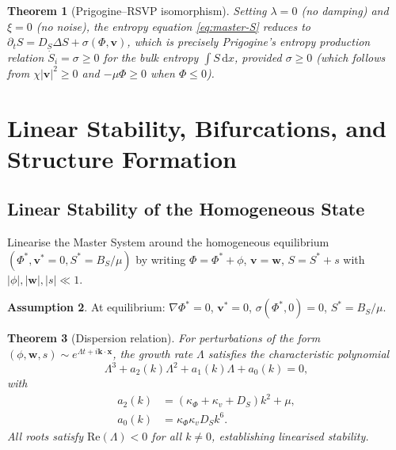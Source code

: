 \documentclass[12pt, a4paper]{article}
\theoremstyle{plain}
\newtheorem{theorem}{Theorem}[section]
\theoremstyle{definition}
\newtheorem{assumption}[theorem]{Assumption}
\theoremstyle{remark}
\newcommand{\vfield}{\mathbf{v}}
\begin{document}
\begin{theorem}[Prigogine--RSVP isomorphism]
\label{thm:prigogine}
Setting $\lambda = 0$ (no damping) and $\xi = 0$ (no noise), the entropy equation
\eqref{eq:master-S} reduces to $\partial_t S = D_S\Delta S + \sigma(\Phi,\vfield)$,
which is precisely Prigogine's entropy production relation
$\dot{S}_i = \sigma \geq 0$ \cite{Prigogine1967} for the bulk entropy $\int S\,\mathrm{d}x$,
provided $\sigma \geq 0$ (which follows from $\chi|\vfield|^2 \geq 0$ and $-\mu\Phi \geq 0$
when $\Phi \leq 0$).
\end{theorem}

\section{Linear Stability, Bifurcations, and Structure Formation}
\label{sec:stability}

\subsection{Linear Stability of the Homogeneous State}

Linearise the Master System around the homogeneous equilibrium
$(\Phi^*, \vfield^* = 0, S^* = B_S/\mu)$ by writing
$\Phi = \Phi^* + \phi$, $\vfield = \mathbf{w}$, $S = S^* + s$ with $|\phi|,|\mathbf{w}|,|s| \ll 1$.

\begin{assumption}
At equilibrium: $\nabla\Phi^* = 0$, $\vfield^* = 0$, $\sigma(\Phi^*, 0) = 0$,
$S^* = B_S/\mu$.
\end{assumption}

\begin{theorem}[Dispersion relation]
\label{thm:dispersion}
For perturbations of the form $(\phi, \mathbf{w}, s) \sim e^{\Lambda t + i\mathbf{k}\cdot\mathbf{x}}$,
the growth rate $\Lambda$ satisfies the characteristic polynomial
\[
\Lambda^3 + a_2(k)\Lambda^2 + a_1(k)\Lambda + a_0(k) = 0,
\]
with
\begin{align*}
a_2(k) &= (\kappa_\Phi + \kappa_v + D_S)k^2 + \mu,\\
a_0(k) &= \kappa_\Phi\kappa_v D_S k^6.
\end{align*}
All roots satisfy $\mathrm{Re}(\Lambda) < 0$ for all $k \neq 0$, establishing linearised
stability.
\end{theorem}
\end{document}
